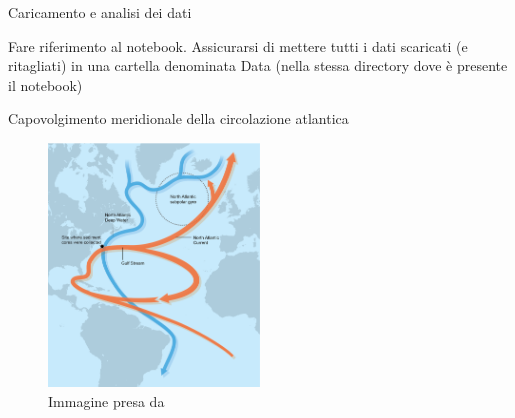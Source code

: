 \documentclass{beamer}
\begin{document}
\begin{frame}{Caricamento e analisi dei dati}
\begin{center}
Fare riferimento al notebook. Assicurarsi di mettere tutti i dati scaricati (e ritagliati) in una cartella denominata Data (nella stessa directory dove è presente il notebook)
\end{center}
\end{frame}


\begin{frame}{Capovolgimento meridionale della circolazione atlantica}
\begin{figure}
\begin{center}
\includegraphics[width=0.5\textwidth ]{Pic/AMOC_graphic.png}\\
Immagine presa da \cite{AMOC}
\end{center}
\end{figure}
\end{frame}
\end{document}
